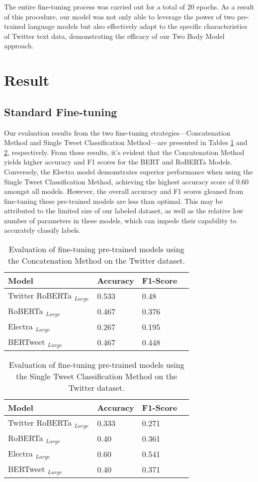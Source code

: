 \documentclass[]{ceurart}
\begin{document}
The entire fine-tuning process was carried out for a total of 20 epochs. As a result of this procedure, our model was not only able to leverage the power of two pre-trained language models but also effectively adapt to the specific characteristics of Twitter text data, demonstrating the efficacy of our Two Body Model approach.

\section{Result}

\subsection{Standard Fine-tuning}
Our evaluation results from the two fine-tuning strategies—Concatenation Method and Single Tweet Classification Method—are presented in Tables \ref{table:1} and \ref{table:2}, respectively. From these results, it's evident that the Concatenation Method yields higher accuracy and F1 scores for the BERT and RoBERTa Models. Conversely, the Electra model demonstrates superior performance when using the Single Tweet Classification Method, achieving the highest accuracy score of 0.60 amongst all models. However, the overall accuracy and F1 scores gleaned from fine-tuning these pre-trained models are less than optimal. This may be attributed to the limited size of our labeled dataset, as well as the relative low number of parameters in these models, which can impede their capability to accurately classify labels.

\begin{table}[ht]
\caption{Evaluation of fine-tuning pre-trained models using the Concatenation Method on the Twitter dataset.}
\centering
\begin{tabular}{llll}
\hline
\textbf{Model} &\textbf{Accuracy} & \textbf{F1-Score}\\
\hline
{Twitter RoBERTa $_{Large}$} & {0.533} & {0.48}\\
{RoBERTa $_{Large}$}& {0.467} & {0.376}\\
{Electra $_{Large}$} & {0.267} & {0.195}\\
{BERTweet $_{Large}$} & {0.467} & {0.448}\\
\hline
\end{tabular}
\label{table:1}
\end{table}

\begin{table}[ht]
\caption{Evaluation of fine-tuning pre-trained models using the Single Tweet Classification Method on the Twitter dataset.}
\centering
\begin{tabular}{llll}
\hline
\textbf{Model} &\textbf{Accuracy} & \textbf{F1-Score}\\
\hline
{Twitter RoBERTa $_{Large}$}  & {0.333} & {0.271}\\
{RoBERTa $_{Large}$} & {0.40} & {0.361}\\
{Electra $_{Large}$}& {0.60} & {0.541}\\
{BERTweet $_{Large}$} & {0.40} & {0.371}\\
\hline
\end{tabular}
\label{table:2}
\end{table}
\end{document}
